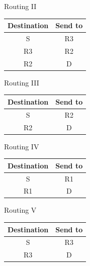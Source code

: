 \documentclass[letterpaper, 12 pt, conference]{ieeeconf}  %
\begin{document}
\begin{center}
Routing II
\end{center}

\begin{center}
 \begin{tabular}{||c c||} 
 \hline
 Destination & Send to  \\ [0.25ex] 
 \hline\hline
 S & R3  \\ 
 \hline
 R3 & R2  \\
 \hline
 R2 & D \\
 
 \hline
\end{tabular}
\end{center}

\begin{center}
Routing III
\end{center}

\begin{center}
 \begin{tabular}{||c c||} 
 \hline
 Destination & Send to  \\ [0.25ex] 
 \hline\hline
 S & R2  \\ 
 \hline
 R2 & D  \\
 
 \hline
\end{tabular}
\end{center}

\begin{center}
Routing IV
\end{center}

\begin{center}
 \begin{tabular}{||c c||} 
 \hline
 Destination & Send to  \\ [0.25ex] 
 \hline\hline
 S & R1  \\ 
 \hline
 R1 & D  \\
 
 \hline
\end{tabular}
\end{center}

\begin{center}
Routing V
\end{center}

\begin{center}
 \begin{tabular}{||c c||} 
 \hline
 Destination & Send to  \\ [0.25ex] 
 \hline\hline
 S & R3  \\ 
 \hline
 R3 & D  \\
 
 \hline
\end{tabular}
\end{center}
\end{document}
